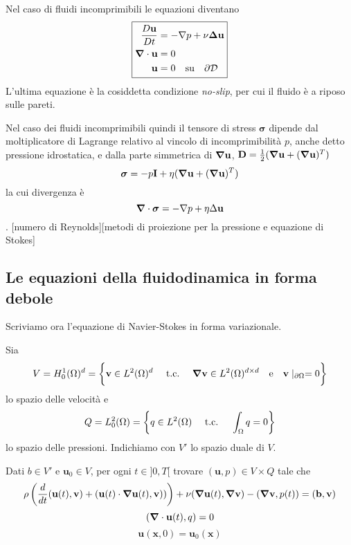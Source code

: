 Nel caso di fluidi incomprimibili le equazioni diventano
\begin{equation}
\boxed{
\begin{aligned}
\frac{D\mathbf{u}}{Dt} &= - \nabla p + \nu \boldsymbol{\Delta} \mathbf{u} \\
\boldsymbol{\nabla} \cdot  \mathbf{u} &= 0 \\
\mathbf{u} &= 0 \quad \text{su} \quad \partial \mathcal{D}
\end{aligned}
}
\end{equation}
L'ultima equazione è la cosiddetta condizione \emph{no-slip}, per cui il fluido è a riposo sulle pareti.

Nel caso dei fluidi incomprimibili quindi il tensore di stress $\boldsymbol{\sigma}$ dipende dal moltiplicatore di Lagrange relativo al vincolo di incomprimibilità $p$, anche detto pressione idrostatica, e dalla parte simmetrica di $\boldsymbol{\nabla}\mathbf{u}$, $\mathbf{D}=\frac{1}{2}(\boldsymbol{\nabla}\mathbf{u}+(\boldsymbol{\nabla}\mathbf{u})^{T})$
$$\boldsymbol{\sigma}=-p\mathbf{I}+\eta(\boldsymbol{\nabla}\mathbf{u}+(\boldsymbol{\nabla}\mathbf{u})^{T})$$
la cui divergenza è
$$\boldsymbol{\nabla}\cdot\boldsymbol{\sigma}=-\nabla p+\eta\Delta\mathbf{u}$$.
[numero di Reynolds][metodi di proiezione per la pressione e equazione di Stokes]

\subsection{Le equazioni della fluidodinamica in forma debole}
Scriviamo ora l'equazione di Navier-Stokes in forma variazionale.

Sia
$$V = H^1_0(\Omega)^d = \bigg \{ \mathbf{v} \in L^2(\Omega)^d \quad \ \text{t.c.}\  \quad \boldsymbol{\nabla} \mathbf{v} \in L^2(\Omega)^{d \times d} \quad \text{e} \quad \mathbf{v}\mid_{\partial \Omega} = 0 \bigg \} $$
lo spazio delle velocità e 
$$Q = L^2_0(\Omega) = \left  \{ q \in L^2(\Omega) \quad \ \text{t.c.}\  \quad \int_{\Omega}q=0 \right  \}$$ lo spazio delle pressioni. Indichiamo con $V'$ lo spazio duale di $V$.

Dati $b \in V'$ e $\mathbf{u}_0 \in V$, per ogni $t \in ]0,T[$ trovare $(\mathbf{u},p) \in V \times Q$ tale che
\begin{multline*}
\rho \left ( \frac{d}{dt}\ps{\mathbf{u}(t)}{\mathbf{v}} + \ps{\mathbf{u}(t)\cdot \Nabla\mathbf{u}(t)}{\mathbf{v})}\right)+ \nu\ps{\Nabla\mathbf{u}(t)}{\Nabla\mathbf{v}}-\ps{\Nabla \mathbf{v}}{p(t)}=\ps{\mathbf{b}}{\mathbf{v}}
\end{multline*}
$$\ps{\Nabla\cdot\mathbf{u}(t)}{q}=0$$
$$\mathbf{u}(\mathbf{x},0)=\mathbf{u}_0(\mathbf{x})$$

